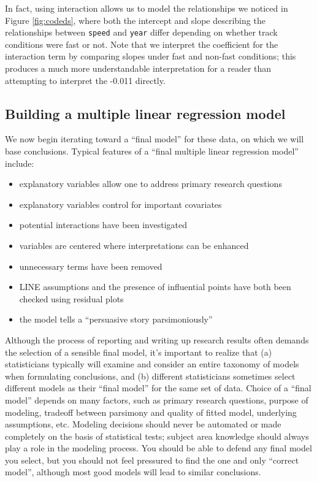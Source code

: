 \documentclass[
]{krantz}
\providecommand{\tightlist}{%
  \setlength{\itemsep}{0pt}\setlength{\parskip}{0pt}}
\begin{document}
In fact, using interaction allows us to model the relationships we noticed in Figure \ref{fig:codeds}, where both the intercept and slope describing the relationships between \texttt{speed} and \texttt{year} differ depending on whether track conditions were fast or not. Note that we interpret the coefficient for the interaction term by comparing slopes under fast and non-fast conditions; this produces a much more understandable interpretation for a reader than attempting to interpret the -0.011 directly.

\hypertarget{multreg_build}{%
\subsection{Building a multiple linear regression model}\label{multreg_build}}

We now begin iterating toward a ``final model'' for these data, on which we will base conclusions. Typical features of a ``final multiple linear regression model'' include:

\begin{itemize}
\tightlist
\item
  explanatory variables allow one to address primary research questions
\item
  explanatory variables control for important covariates
\item
  potential interactions have been investigated
\item
  variables are centered where interpretations can be enhanced
\item
  unnecessary terms have been removed
\item
  LINE assumptions and the presence of influential points have both been checked using residual plots
\item
  the model tells a ``persuasive story parsimoniously''
\end{itemize}

Although the process of reporting and writing up research results often demands the selection of a sensible final model, it's important to realize that (a) statisticians typically will examine and consider an entire taxonomy of models when formulating conclusions, and (b) different statisticians sometimes select different models as their ``final model'' for the same set of data. Choice of a ``final model'' depends on many factors, such as primary research questions, purpose of modeling, tradeoff between parsimony and quality of fitted model, underlying assumptions, etc. Modeling decisions should never be automated or made completely on the basis of statistical tests; subject area knowledge should always play a role in the modeling process. You should be able to defend any final model you select, but you should not feel pressured to find the one and only ``correct model'', although most good models will lead to similar conclusions.
\end{document}
